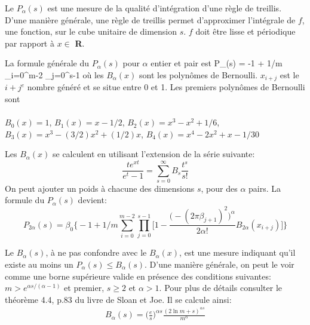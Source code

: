 
\baselineskip=14pt

Le $P_\alpha(s)$ est une mesure de la qualit\'e d'int\'egration d'une
r\`egle de treillis.  D'une mani\`ere g\'en\'erale, 
une r\`egle de treillis permet d'approximer
l'int\'egrale de $f$, une fonction, sur le cube unitaire de dimension $s$.
$f$ doit \^etre lisse et p\'eriodique par rapport \`a $x \in$ {\bf R}.

La formule g\'en\'erale du $P_\alpha(s)$ pour $\alpha$ entier et pair est 
\eq
  P_\alpha (s) = -1 + 1/m \sum_{i=0}^{m-2} \prod_{j=0}^{s-1}  
										\label{eq:Palpha}
\endeq
o\`u les $B_\alpha(x)$ sont les polyn\^omes de Bernoulli. $x_{i+j}$ est le $i+j^e$ nombre
g\'en\'er\'e et se situe entre 0 et 1.
Les premiers polyn\^omes de Bernoulli sont \\\\ 
\hspace*{18mm} \baselineskip=18pt
$B_0(x)=1$,\hspace*{9mm} $B_1(x)=x-1/2$,\hspace*{9mm}
$B_2(x)=x^3-x^2+1/6$,  \\ \hspace*{18mm}
$B_3(x)=x^3-(3/2)x^2+(1/2)x$,\hspace*{5mm} $B_4(x)=x^4-2x^2+x-1/30$

\noindent
Les $B_\alpha(x)$ se calculent en utilisant l'extension de la s\'erie suivante:
$$\frac{te^{xt}}{e^t-1} = \sum_{s=0}^{\infty}B_s \frac{t^s}{s!}$$
On peut ajouter un poids \`a chacune des dimensions $s$, pour des $\alpha$ pairs.
La formule du
$P_\alpha(s)$ devient: 
$$P_{2\alpha}(s) = \beta_0 \Big\{ -1 + 1/m \sum_{i=0}^{m-2} \prod_{j=0}^{s-1} \Big[
                     1- \frac{\big( -(2\pi\beta_{j+1})^2\big) ^{\alpha}}{2\alpha !}B_{2\alpha}(x_{i+j}) \Big] \Big\} 
$$

Le $B_\alpha(s)$, \`a ne pas confondre avec le $B_\alpha(x)$, est une mesure
indiquant qu'il existe au moins un $P_\alpha(s) \le B_\alpha(s)$.  D'une mani\`ere
g\'en\'erale, on peut le voir comme une borne sup\'erieure valide en pr\'esence
des conditions suivantes: $m> e^{\alpha s/(\alpha -1)}$ et premier, $s\ge 2$ et
$\alpha > 1$.  Pour plus de d\'etails consulter le th\'eor\`eme 4.4, p.83 du
livre de Sloan et Joe. 
Il se calcule ainsi:
\begin{eqnarray*}
B_\alpha(s) = {\Big( \frac{e}{s} \Big)}^{\alpha s} \frac{(2\ln m + s)^{\alpha s}}{m^\alpha}
\end{eqnarray*} 

